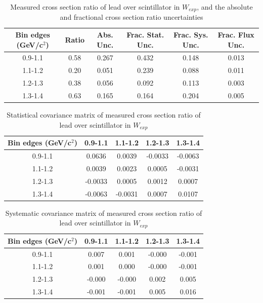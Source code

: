 \documentclass[../main.tex]{subfiles}
\begin{document}
\begin{table}
  \centering
  \renewcommand{\arraystretch}{1.15}
  \caption{Measured cross section ratio of lead over scintillator in $W_{exp}$, and the absolute and fractional cross section ratio uncertainties}
    \begin{tabular}{c||c|c||c|c|c}
      Bin edges (GeV/c${}^2$) &  Ratio  &  Abs. Unc.  &  Frac. Stat. Unc.  &  Frac. Sys. Unc.  &  Frac. Flux Unc. \\
      \hline
      \hline
      0.9-1.1 & 0.58 & 0.267 & 0.432 & 0.148 & 0.013\\
      1.1-1.2 & 0.20 & 0.051 & 0.239 & 0.088 & 0.011\\
      1.2-1.3 & 0.38 & 0.056 & 0.092 & 0.113 & 0.003\\
      1.3-1.4 & 0.63 & 0.165 & 0.164 & 0.204 & 0.005
    \end{tabular}
  \label{tbl:rationucleonnuc82Wa}
\end{table}
\begin{table}
  \centering
  \renewcommand{\arraystretch}{1.15}
  \caption{Statistical covariance matrix of measured cross section ratio of lead over scintillator in $W_{exp}$}
    \begin{tabular}{c||cccc}
      Bin edges (GeV/c${}^2$) & 0.9-1.1 & 1.1-1.2 & 1.2-1.3 & 1.3-1.4\\
      \hline
      \hline
      0.9-1.1 & 0.0636 & 0.0039 & -0.0033 & -0.0063\\
      1.1-1.2 & 0.0039 & 0.0023 & 0.0005 & -0.0031\\
      1.2-1.3 & -0.0033 & 0.0005 & 0.0012 & 0.0007\\
      1.3-1.4 & -0.0063 & -0.0031 & 0.0007 & 0.0107
    \end{tabular}
  \label{tbl:rationucleonnuc82Wb}
\end{table}
\begin{table}
  \centering
  \renewcommand{\arraystretch}{1.15}
  \caption{Systematic covariance matrix of measured cross section ratio of lead over scintillator in $W_{exp}$}
    \begin{tabular}{c||cccc}
      Bin edges (GeV/c${}^2$) & 0.9-1.1 & 1.1-1.2 & 1.2-1.3 & 1.3-1.4\\
      \hline
      \hline
      0.9-1.1 & 0.007 & 0.001 & -0.000 & -0.001\\
      1.1-1.2 & 0.001 & 0.000 & -0.000 & -0.001\\
      1.2-1.3 & -0.000 & -0.000 & 0.002 & 0.005\\
      1.3-1.4 & -0.001 & -0.001 & 0.005 & 0.016
    \end{tabular}
  \label{tbl:rationucleonnuc82Wc}
\end{table}
\end{document}
